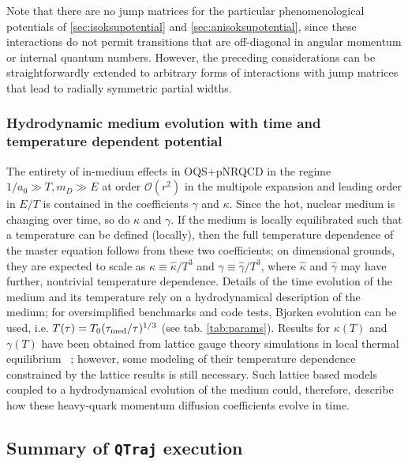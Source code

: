 \documentclass[times,sort&compress,final]{elsarticle}
\def\qtraj{{\tt QTraj} }
\begin{document}
Note that there are no jump matrices for the particular phenomenological potentials 
of \ref{sec:isoksupotential} and \ref{sec:anisoksupotential}, since these interactions do not 
permit transitions that are off-diagonal in angular momentum or internal quantum numbers. 
However, the preceding considerations can be straightforwardly extended to arbitrary forms of 
interactions with jump matrices that lead to radially symmetric partial widths.

\subsubsection{Hydrodynamic medium evolution with time and temperature dependent potential}

The entirety of in-medium effects in OQS+pNRQCD in the regime $1/a_0 \gg T,m_D\gg E$ at order $\mathcal{O}(r^2)$ in the multipole expansion and leading order in $E/T$ is contained in the coefficients $\gamma$ and $\kappa$. 
Since the hot, nuclear medium is changing over time, so do $\kappa$ and $\gamma$. 
If the medium is locally equilibrated such that a temperature can be defined (locally), 
then the full temperature dependence of the master equation follows from these two coefficients; 
on dimensional grounds, they are expected to scale as $\kappa \equiv \hat{\kappa}/T^3$ and $\gamma \equiv \hat{\gamma}/T^3$, where $\hat{\kappa}$ and $\hat{\gamma}$ may have further, 
nontrivial temperature dependence. 
Details of the time evolution of the medium and its temperature rely on a hydrodynamical description 
of the medium; for oversimplified benchmarks and code tests, Bjorken evolution can be used, i.e. $T(\tau) = T_0 (\tau_{\rm med}/\tau)^{1/3}$ (see tab. \ref{tab:params}).
Results for $\kappa(T)$ and $\gamma(T)$ have been obtained from lattice gauge theory 
simulations in local thermal equilibrium ~\cite{Brambilla:2019tpt, Brambilla:2020siz}; 
however, some modeling of their temperature dependence constrained by the lattice results is still necessary.
Such lattice based models coupled to a hydrodynamical evolution of the medium could, therefore, describe 
how these heavy-quark momentum diffusion coefficients evolve in time.

\subsection{Summary of \qtraj execution}
\label{ssec:algo}
\end{document}
